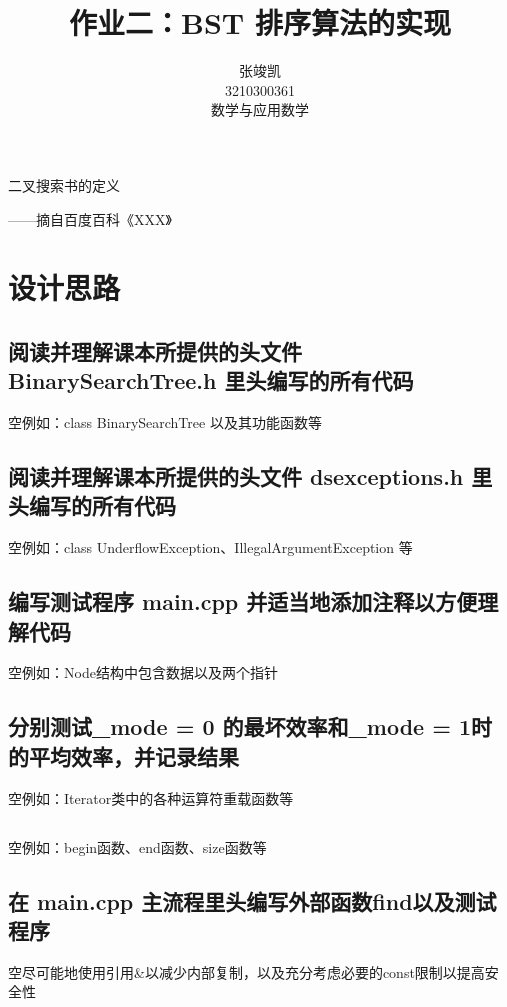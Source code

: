 \documentclass[UTF8]{ctexart}
\title{作业二：BST 排序算法的实现}
\author{张竣凯 \\ 3210300361 \\ 数学与应用数学}
\begin{document}
\maketitle

二叉搜索书的定义

\begin{flushright}
——摘自百度百科《XXX》
\end{flushright}

\section{设计思路}

\subsection{阅读并理解课本所提供的头文件 BinarySearchTree.h 里头编写的所有代码}
\hphantom 空例如：class BinarySearchTree 以及其功能函数等

\subsection{阅读并理解课本所提供的头文件 dsexceptions.h 里头编写的所有代码}
\hphantom 空例如：class UnderflowException、IllegalArgumentException 等

\subsection{编写测试程序 main.cpp 并适当地添加注释以方便理解代码}
\hphantom 空例如：Node结构中包含数据以及两个指针

\subsection{分别测试_mode = 0 的最坏效率和_mode = 1时的平均效率，并记录结果}
\hphantom 空例如：Iterator类中的各种运算符重载函数等

\subsection{}
\hphantom 空例如：begin函数、end函数、size函数等

\subsection{在 main.cpp 主流程里头编写外部函数find以及测试程序}
\hphantom 空尽可能地使用引用&以减少内部复制，以及充分考虑必要的const限制以提高安全性
\end{document}

